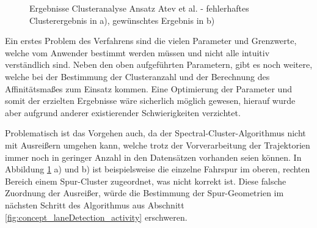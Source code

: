 \begin{figure}[H]
    \centering
    \qquad \qquad
    \caption[Ergebnisse Clusteranalyse Ansatz Atev et al.]
            {Ergebnisse Clusteranalyse Ansatz Atev et al. - fehlerhaftes Clusterergebnis in a), gewünschtes Ergebnis in b)}
    \label{fig:real_results_atev1}
\end{figure}

Ein erstes Problem des Verfahrens sind die vielen Parameter und Grenzwerte, welche vom Anwender bestimmt werden müssen und
nicht alle intuitiv verständlich sind.
Neben den oben aufgeführten Parametern, gibt es noch weitere, welche bei der Bestimmung der Clusteranzahl und der
Berechnung des Affinitätsmaßes zum Einsatz kommen.
Eine Optimierung der Parameter und somit der erzielten Ergebnisse wäre sicherlich möglich gewesen,
hierauf wurde aber aufgrund anderer existierender Schwierigkeiten verzichtet.

Problematisch ist das Vorgehen auch, da der Spectral-Cluster-Algorithmus nicht mit Ausreißern umgehen kann,
welche trotz der Vorverarbeitung der Trajektorien immer noch in geringer Anzahl in den Datensätzen vorhanden seien können.
In Abbildung \ref{fig:real_results_atev1} a) und b) ist beispielsweise die einzelne Fahrspur im oberen, rechten Bereich
einem Spur-Cluster zugeordnet, was nicht korrekt ist.
Diese falsche Zuordnung der Ausreißer, würde die Bestimmung der Spur-Geometrien im nächsten Schritt des
Algorithmus aus Abschnitt \ref{fig:concept_laneDetection_activity} erschweren.

